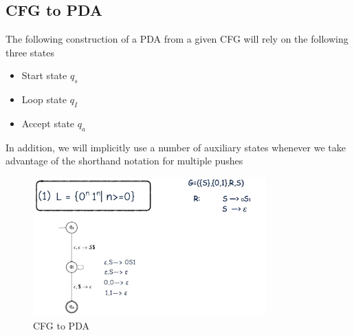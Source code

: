 \documentclass[a4paper]{article}
\theoremstyle{plain}
\theoremstyle{definition}
\newtheorem{defn}{Definition}[section]
\newtheorem{exmp}{Example}[section]
\theoremstyle{remark}
\begin{document}
\subsection{CFG to PDA}
\begin{tcolorbox}[colback=black!3!white,colframe=black!60!white,title=\begin{defn}CFG to PDA \label{CFG to PDA}\end{defn}]
The following construction of a PDA from a given CFG will rely on the following three states
\begin{itemize}
	\item Start state $q_s$ 
	\item Loop state $q_I$ 
	\item Accept state $q_a$
\end{itemize}
In addition, we will implicitly use a number of auxiliary states whenever we take advantage of the shorthand notation for multiple pushes
\end{tcolorbox}
\begin{tcolorbox}[colback=black!3!white,colframe=black!60!white,title=\begin{exmp}CFG to PDA example \label{}\end{exmp}]
        \begin{figure}[H]
        	\centering
        	\includegraphics[width=0.8\textwidth]{sixteen.png}
        	\caption{CFG to PDA}
        	\label{CFG}
        \end{figure}
\end{tcolorbox}
\end{document}
